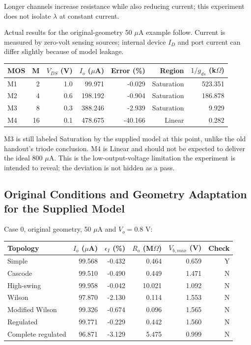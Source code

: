 Longer channels increase resistance while also reducing current; this experiment does not isolate $\lambda$ at constant current.

Actual results for the original-geometry 50 $\mu$A example follow. Current is measured by zero-volt sensing sources; internal device $I_D$ and port current can differ slightly because of model leakage.

\begin{center}\small
\begin{tabular}{lrrrrrr}
\toprule
MOS & M & $V_{DS}$ (V) & $I_o$ ($\mu$A) & Error (\%) & Region & $1/g_{ds}$ (k$\Omega$) \\
\midrule
M1 & 2 & 1.0 & 99.971 & -0.029 & Saturation & 523.351 \\
M2 & 4 & 0.6 & 198.192 & -0.904 & Saturation & 186.878 \\
M3 & 8 & 0.3 & 388.246 & -2.939 & Saturation & 9.929 \\
M4 & 16 & 0.1 & 478.675 & -40.166 & Linear & 0.282 \\
\bottomrule
\end{tabular}
\end{center}

M3 is still labeled Saturation by the supplied model at this point, unlike the old handout's triode conclusion. M4 is Linear and should not be expected to deliver the ideal 800 $\mu$A. This is the low-output-voltage limitation the experiment is intended to reveal; the deviation is not hidden as a pass.

\subsection{Original Conditions and Geometry Adaptation for the Supplied Model}
Case 0, original geometry, 50 $\mu$A and $V_o=0.8$ V:

\begin{center}\small
\begin{tabular}{lrrrrr}
\toprule
Topology & $I_o$ ($\mu$A) & $\epsilon_I$ (\%) & $R_o$ (M$\Omega$) & $V_{b,max}$ (V) & Check \\
\midrule
Simple & 99.568 & -0.432 & 0.464 & 0.659 & Y \\
Cascode & 99.510 & -0.490 & 0.449 & 1.471 & N \\
High-swing & 99.958 & -0.042 & 10.021 & 1.092 & N \\
Wilson & 97.870 & -2.130 & 0.114 & 1.553 & N \\
Modified Wilson & 99.326 & -0.674 & 0.096 & 1.565 & N \\
Regulated & 99.771 & -0.229 & 0.442 & 1.560 & N \\
Complete regulated & 96.871 & -3.129 & 5.475 & 0.999 & N \\
\bottomrule
\end{tabular}
\end{center}

